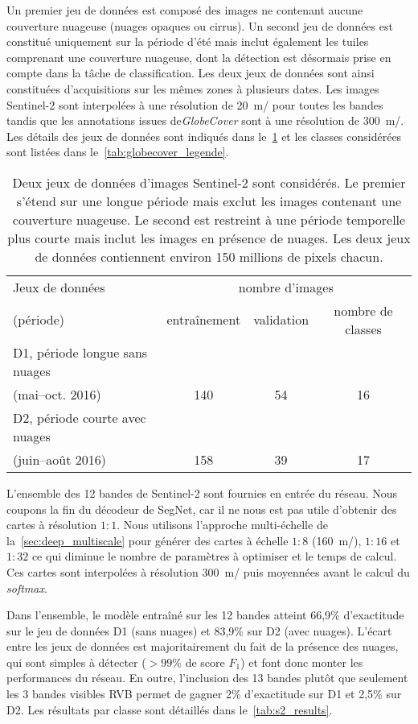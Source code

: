 Un premier jeu de données est composé des images ne contenant aucune couverture nuageuse (nuages opaques ou cirrus). Un second jeu de données est constitué uniquement sur la période d'été mais inclut également les tuiles comprenant une couverture nuageuse, dont la détection est désormais prise en compte dans la tâche de classification. Les deux jeux de données sont ainsi constituées d'acquisitions sur les mêmes zones à plusieurs dates. Les images Sentinel-2 sont interpolées à une résolution de \SI{20}{\meter/\px} pour toutes les bandes tandis que les annotations issues de\emph{GlobeCover} sont à une résolution de \SI{300}{\meter/\px}. Les détails des jeux de données sont indiqués dans le~\cref{tab:datasets} et les classes considérées sont listées dans le~\cref{tab:globecover_legende}.

\begin{table}
\caption{Deux jeux de données d'images Sentinel-2 sont considérés. Le premier s'étend sur une longue période mais exclut les images contenant une couverture nuageuse. Le second est restreint à une période temporelle plus courte mais inclut les images en présence de nuages. Les deux jeux de données contiennent environ 150 millions de pixels chacun.}
\label{tab:datasets}
\begin{tabular}{lccc}
\toprule
Jeux de données & \multicolumn{3}{c}{nombre d'images}\\
(période)  & entraînement & validation  & nombre de classes \\
\midrule
D1, période longue sans nuages & & & \\
 (mai--oct. 2016) & 140 & 54 & 16 \\
\midrule
D2, période courte avec nuages & & & \\
(juin--août 2016) & 158 & 39 & 17 \\
\bottomrule
\end{tabular}
\end{table}

L'ensemble des 12 bandes de Sentinel-2 sont fournies en entrée du réseau. Nous coupons la fin du décodeur de SegNet, car il ne nous est pas utile d'obtenir des cartes à résolution $1:1$. Nous utilisons l'approche multi-échelle de la~\cref{sec:deep_multiscale} pour générer des cartes à échelle $1:8$ (\SI{160}{\meter/\px}), $1:16$ et $1:32$ ce qui diminue le nombre de paramètres à optimiser et le temps de calcul. Ces cartes sont interpolées à résolution \SI{300}{\meter/\px} puis moyennées avant le calcul du \emph{softmax}.

Dans l'ensemble, le modèle entraîné sur les 12 bandes atteint 66,9\% d'exactitude sur le jeu de données D1 (sans nuages) et 83,9\% sur D2 (avec nuages). L'écart entre les jeux de données est majoritairement du fait de la présence des nuages, qui sont simples à détecter ($>99\%$ de score $F_1$) et font donc monter les performances du réseau. En outre, l'inclusion des 13 bandes plutôt que seulement les 3 bandes visibles \gls{RVB} permet de gagner 2\% d'exactitude sur D1 et 2,5\% sur D2. Les résultats par classe sont détaillés dans le~\cref{tab:s2_results}.

